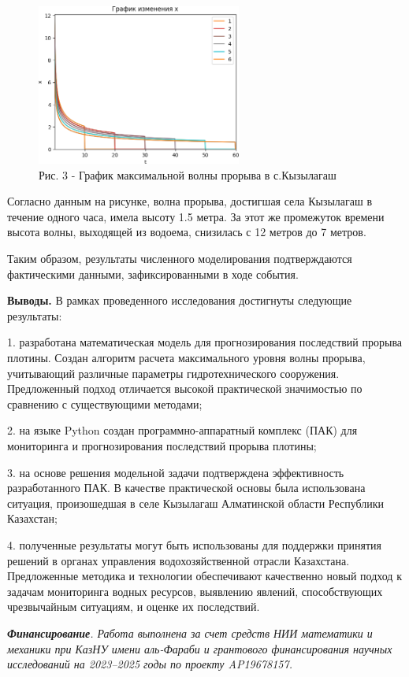 \begin{figure}[H]
	\centering
	\includegraphics[width=0.6\textwidth]{media/ict/image4}
	\caption*{Рис. 3 - График максимальной волны прорыва в с.Кызылагаш}
\end{figure}

\begin{multicols}{2}
Согласно данным на рисунке, волна прорыва, достигшая села Кызылагаш в
течение одного часа, имела высоту 1.5 метра. За этот же промежуток
времени высота волны, выходящей из водоема, снизилась с 12 метров до 7
метров.

Таким образом, результаты численного моделирования подтверждаются
фактическими данными, зафиксированными в ходе события.

{\bfseries Выводы.} В рамках проведенного исследования достигнуты следующие
результаты:

1. разработана математическая модель для прогнозирования последствий
прорыва плотины. Создан алгоритм расчета максимального уровня волны
прорыва, учитывающий различные параметры гидротехнического сооружения.
Предложенный подход отличается высокой практической значимостью по
сравнению с существующими методами;

2. на языке Python создан программно-аппаратный комплекс (ПАК) для
мониторинга и прогнозирования последствий прорыва плотины;

3. на основе решения модельной задачи подтверждена эффективность
разработанного ПАК. В качестве практической основы была использована
ситуация, произошедшая в селе Кызылагаш Алматинской области Республики
Казахстан;

4. полученные результаты могут быть использованы для поддержки принятия
решений в органах управления водохозяйственной отрасли Казахстана.
Предложенные методика и технологии обеспечивают качественно новый
подход к задачам мониторинга водных ресурсов, выявлению явлений,
способствующих чрезвычайным ситуациям, и оценке их последствий.

\emph{{\bfseries Финансирование}. Работа выполнена за счет средств НИИ
математики и механики при КазНУ имени аль-Фараби и грантового
финансирования научных исследований на 2023--2025 годы по проекту
AP19678157.}
\end{multicols}

